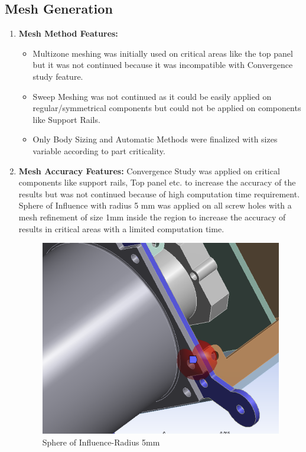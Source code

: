 \documentclass[../../main.tex]{subfiles}
\begin{document}
\subsection {Mesh Generation}
    \begin{enumerate}
        \item \textbf{Mesh Method Features: 
        }
        \begin{itemize}
            \item Multizone meshing was initially used on critical areas like the top panel but it was not continued because it was incompatible with Convergence study feature.
            \item Sweep Meshing was not continued as it could be easily applied on regular/symmetrical components but could not be applied on components like Support Rails.
            \item Only Body Sizing and Automatic Methods were finalized with sizes variable according to part criticality.
        \end{itemize}
        \item \textbf{Mesh Accuracy Features: }Convergence Study was applied on critical components like support rails, Top panel etc. to increase the accuracy of the results but was not continued because of high computation time requirement. Sphere of Influence with radius 5 mm was applied on all screw holes with a mesh refinement of size 1mm inside the region to increase the accuracy of results in critical areas with a limited computation time.
        \begin{figure}[H]
            \centering
            \includegraphics[scale=0.5]{Figures/Mechanical/spoi.PNG}
            \caption{Sphere of Influence-Radius 5mm}
            \label{fig:sys_CAD}
        \end{figure}
    \end{enumerate}
\end{document}
